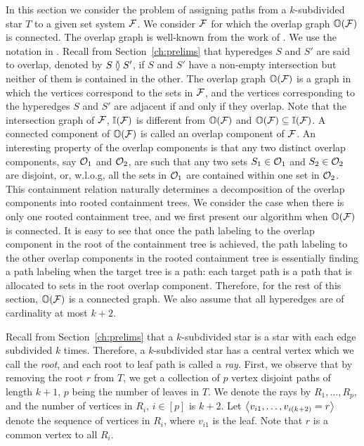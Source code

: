 In this section we consider the problem of assigning paths from a
$k$-subdivided star $T$ to a given set system ${\cal F}$.  We consider
${\cal F}$ for which the overlap graph $\mathbb O({\cal F})$ is connected.  The
overlap graph is well-known from the work of
\cite{kklv10,nsnrs09,wlh02}.  We use the notation in
\cite{kklv10}. Recall from Section~\ref{ch:prelims} that hyperedges
$S$ and $S'$ are said to overlap, denoted by $S \between S'$, if $S$
and $S'$ have a non-empty intersection but neither of them is
contained in the other. The overlap graph $\mathbb O({\cal F})$ is a graph in
which the vertices correspond to the sets in ${\cal F}$, and the vertices
corresponding to the hyperedges $S$ and $S'$ are adjacent if and only
if they overlap.  Note that the intersection graph of ${\cal F}$,
$\mathbb I({\cal F})$ is different from $\mathbb O({\cal F})$ and $\mathbb O({\cal F}) \subseteq
\mathbb I({\cal F})$.  A connected component of $\mathbb O({\cal F})$ is called an overlap
component of ${\cal F}$.  An interesting property of the overlap components
is that any two distinct overlap components, say ${\cal O}_1$ and ${\cal O}_2$,
are such that any two sets $S_1 \in {\cal O}_1$ and $S_2 \in {\cal O}_2$ are
disjoint, or, w.l.o.g, all the sets in ${\cal O}_1$ are contained within
one set in ${\cal O}_2$.  This containment relation naturally determines a
decomposition of the overlap components into rooted containment trees.
We consider the case when there is only one rooted containment tree,
and we first present our algorithm when $\mathbb O({\cal F})$ is connected.  It
is easy to see that once the path labeling to the overlap component in
the root of the containment tree is achieved, the path labeling to the
other overlap components in the rooted containment tree is essentially
finding a path labeling when the target tree is a path: each target
path is a path that is allocated to sets in the root overlap
component.  Therefore, for the rest of this section, $\mathbb O({\cal F})$ is a
connected graph. We also assume that all hyperedges are of cardinality
at most $k+2$.

Recall from Section~\ref{ch:prelims} that a $k$-subdivided star is a
star with each edge subdivided $k$ times. Therefore, a $k$-subdivided
star has a central vertex which we call the {\em root}, and each root
to leaf path is called a {\em ray}. First, we observe that by removing
the root $r$ from $T$, we get a collection of $p$ vertex disjoint
paths of length $k+1$, $p$ being the number of leaves in $T$.  We
denote the rays by $R_1, \ldots, R_p$, and the number of vertices in
$R_i$, $i \in [p]$ is $k+2$.  Let $\left\langle v_{i1},\ldots,v_{i(k+2)}=r \right\rangle$
denote the sequence of vertices in $R_i$, where $v_{i1}$ is the
leaf. Note that $r$ is a common vertex to all $R_i$.

